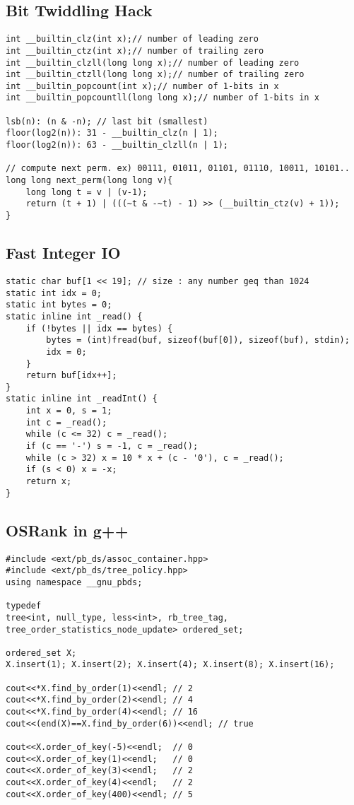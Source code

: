 \documentclass[landscape, 8pt, a4paper, oneside, twocolumn]{extarticle}
\begin{document}
\subsection {Bit Twiddling Hack}
\begin{verbatim}
int __builtin_clz(int x);// number of leading zero
int __builtin_ctz(int x);// number of trailing zero
int __builtin_clzll(long long x);// number of leading zero
int __builtin_ctzll(long long x);// number of trailing zero
int __builtin_popcount(int x);// number of 1-bits in x
int __builtin_popcountll(long long x);// number of 1-bits in x

lsb(n): (n & -n); // last bit (smallest)
floor(log2(n)): 31 - __builtin_clz(n | 1);
floor(log2(n)): 63 - __builtin_clzll(n | 1);

// compute next perm. ex) 00111, 01011, 01101, 01110, 10011, 10101..
long long next_perm(long long v){
	long long t = v | (v-1);
	return (t + 1) | (((~t & -~t) - 1) >> (__builtin_ctz(v) + 1));
}
\end{verbatim}
\subsection {Fast Integer IO}
\begin{verbatim}
static char buf[1 << 19]; // size : any number geq than 1024
static int idx = 0;
static int bytes = 0;
static inline int _read() {
	if (!bytes || idx == bytes) {
		bytes = (int)fread(buf, sizeof(buf[0]), sizeof(buf), stdin);
		idx = 0;
	}
	return buf[idx++];
}
static inline int _readInt() {
	int x = 0, s = 1;
	int c = _read();
	while (c <= 32) c = _read();
	if (c == '-') s = -1, c = _read();
	while (c > 32) x = 10 * x + (c - '0'), c = _read();
	if (s < 0) x = -x;
	return x;
}
\end{verbatim}
\subsection {OSRank in g++}
\begin{verbatim}
#include <ext/pb_ds/assoc_container.hpp>
#include <ext/pb_ds/tree_policy.hpp>
using namespace __gnu_pbds;

typedef
tree<int, null_type, less<int>, rb_tree_tag, tree_order_statistics_node_update> ordered_set;

ordered_set X;
X.insert(1); X.insert(2); X.insert(4); X.insert(8); X.insert(16);

cout<<*X.find_by_order(1)<<endl; // 2
cout<<*X.find_by_order(2)<<endl; // 4
cout<<*X.find_by_order(4)<<endl; // 16
cout<<(end(X)==X.find_by_order(6))<<endl; // true

cout<<X.order_of_key(-5)<<endl;  // 0
cout<<X.order_of_key(1)<<endl;   // 0
cout<<X.order_of_key(3)<<endl;   // 2
cout<<X.order_of_key(4)<<endl;   // 2
cout<<X.order_of_key(400)<<endl; // 5
\end{verbatim}
\end{document}
